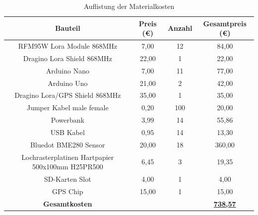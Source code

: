 \documentclass[a4paper,11pt,DIV=calc,tablecaptionabove,headinclude,twoside]{article}
\begin{document}
\begin{table}[h]
\caption{Auflistung der Materialkosten}
\begin{tabular}{|c|c|c|c|}
\hline
Bauteil & Preis (\euro) & Anzahl & Gesamtpreis (\euro) \\\hline \hline
RFM95W Lora Module 868MHz  & 7,00 & 12 & 84,00 \\\hline
Dragino Lora Shield 868MHz & 22,00 & 1 & 22,00 \\\hline
Arduino Nano & 7,00 & 11 & 77,00 \\\hline
Arduino Uno & 21,00 & 2 & 42,00 \\\hline
Dragino Lora/GPS Shield 868MHz & 35,00 & 1 & 35,00 \\\hline
Jumper Kabel male female & 0,20 & 100 & 20,00 \\\hline
Powerbank & 3,99 & 14 & 55,86 \\\hline
USB Kabel & 0,95 & 14 & 13,30 \\\hline
Bluedot BME280 Sensor & 20,00 & 18 & 360,00 \\\hline
Lochrasterplatinen Hartpapier 500x100mm H25PR500 & 6,45 & 3 & 19,35 \\\hline
SD-Karten Slot & 4,00 & 1 & 4,00 \\ \hline
GPS Chip & 15,00 & 1 & 15,00 \\\hline \hline
\textbf{Gesamtkosten} & & & \underline{\textbf{738,57}}  \\ \hline

\end{tabular}
\label{Tab:Kosten}
\end{table}

\newpage

\end{document}
